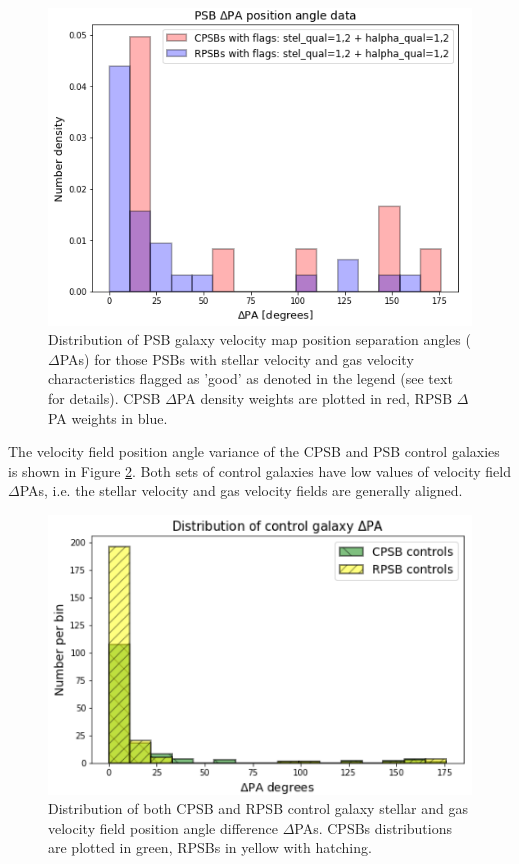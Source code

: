 \begin{figure}
    \centering
    \includegraphics[width=\columnwidth]{images/JupyterPlots/Dist-Delta-PA-All-GoodFlags.png}
    \caption[Distribution of PSB velocity field position angles]{Distribution of PSB galaxy velocity map position separation angles ($\Delta$PAs) for those PSBs with stellar velocity and gas velocity characteristics flagged as 'good' as denoted in the legend (see text for details). CPSB $\Delta$PA density weights are plotted in red, RPSB $\Delta$PA weights in blue.}
    \label{fig:deltaPAdistribution}
\end{figure}

The velocity field position angle variance of the CPSB and PSB control galaxies is shown in Figure \ref{fig:controlDeltaPAs}. Both sets of control galaxies have low values of velocity field $\Delta$PAs, i.e. the stellar velocity and gas velocity fields are generally aligned.

\begin{figure}
    \centering
    \includegraphics[width=\columnwidth]{images/JupyterPlots/DIST-Control-DPA-both.png}
    \caption[Distribution of control galaxy $\Delta$PAs]{Distribution of both CPSB and RPSB control galaxy stellar and gas velocity field position angle difference  $\Delta$PAs. CPSBs distributions are plotted in green, RPSBs in yellow with hatching.}
    \label{fig:controlDeltaPAs}
\end{figure}

